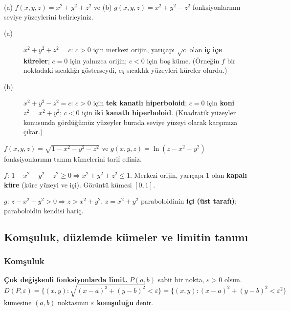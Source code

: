 \begin{soru}
(a) $f(x,y,z)=x^2+y^2+z^2$ ve (b) $g(x,y,z)=x^2+y^2-z^2$ fonksiyonlarının seviye yüzeylerini belirleyiniz.
\end{soru}
\begin{cevap}
\begin{description}
  \item[(a)] $x^2+y^2+z^2=c$: $c>0$ için merkezi orijin, yarıçapı $\sqrt c$ olan \textbf{iç içe küreler}; $c=0$ için
  yalnızca orijin; $c<0$ için boş küme. (Örneğin $f$ bir noktadaki sıcaklığı gösterseydi, eş sıcaklık yüzeyleri küreler
  olurdu.)
  \item[(b)] $x^2+y^2-z^2=c$: $c>0$ için \textbf{tek kanatlı hiperboloid}; $c=0$ için \textbf{koni} $z^2=x^2+y^2$;
  $c<0$ için \textbf{iki kanatlı hiperboloid}. (Kuadratik yüzeyler konusunda gördüğümüz yüzeyler burada seviye yüzeyi
  olarak karşımıza çıkar.)
\end{description}
\end{cevap}

\begin{soru}
$f(x,y,z)=\sqrt{1-x^2-y^2-z^2}$ ve $g(x,y,z)=\ln(z-x^2-y^2)$ fonksiyonlarının tanım kümelerini tarif ediniz.
\end{soru}
\begin{cevap}
$f$: $1-x^2-y^2-z^2\ge 0\Rightarrow x^2+y^2+z^2\le 1$. Merkezi orijin, yarıçapı $1$ olan \textbf{kapalı küre}
(küre yüzeyi ve içi). Görüntü kümesi $[0,1]$.

$g$: $z-x^2-y^2>0\Rightarrow z>x^2+y^2$. $z=x^2+y^2$ paraboloidinin \textbf{içi (üst tarafı)}; paraboloidin kendisi
hariç.
\end{cevap}

\subsection{Komşuluk, düzlemde kümeler ve limitin tanımı}

\subsubsection{Komşuluk}

\begin{tahta}
\textbf{Çok değişkenli fonksiyonlarda limit.} $P(a,b)$ sabit bir nokta, $\varepsilon>0$ olsun.
\[
D(P,\varepsilon)=\Big\{(x,y):\sqrt{(x-a)^2+(y-b)^2}<\varepsilon\Big\}=\big\{(x,y):(x-a)^2+(y-b)^2<\varepsilon^2\big\}
\]
kümesine $(a,b)$ noktasının \textbf{$\varepsilon$ komşuluğu} denir.
\end{tahta}

